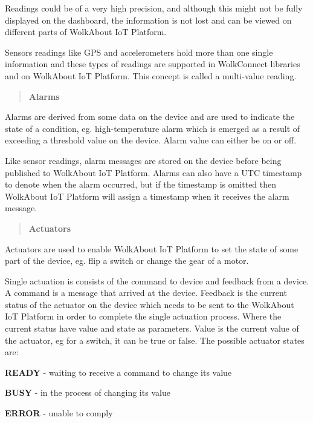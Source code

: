 Readings could be of a very high precision, and although this might not be fully displayed on the dashboard, the information is not lost and can be viewed on different parts of Wolk\+About IoT Platform.

Sensors readings like G\+PS and accelerometers hold more than one single information and these types of readings are supported in Wolk\+Connect libraries and on Wolk\+About IoT Platform. This concept is called a multi-\/value reading.

\label{_alarms}%
 \begin{quote}
{\bfseries Alarms} \end{quote}
Alarms are derived from some data on the device and are used to indicate the state of a condition, eg. high-\/temperature alarm which is emerged as a result of exceeding a threshold value on the device. Alarm value can either be on or off.

Like sensor readings, alarm messages are stored on the device before being published to Wolk\+About IoT Platform. Alarms can also have a U\+TC timestamp to denote when the alarm occurred, but if the timestamp is omitted then Wolk\+About IoT Platform will assign a timestamp when it receives the alarm message.

\label{_actuators}%
 \begin{quote}
{\bfseries Actuators} \end{quote}
Actuators are used to enable Wolk\+About IoT Platform to set the state of some part of the device, eg. flip a switch or change the gear of a motor.

Single actuation is consists of the command to device and feedback from a device. A command is a message that arrived at the device. Feedback is the current status of the actuator on the device which needs to be sent to the Wolk\+About IoT Platform in order to complete the single actuation process. Where the current status have value and state as parameters. Value is the current value of the actuator, eg for a switch, it can be true or false. The possible actuator states are\+:


\begin{DoxyItemize}
\item {\bfseries R\+E\+A\+DY} -\/ waiting to receive a command to change its value
\item {\bfseries B\+U\+SY} -\/ in the process of changing its value
\item {\bfseries E\+R\+R\+OR} -\/ unable to comply
\end{DoxyItemize}

